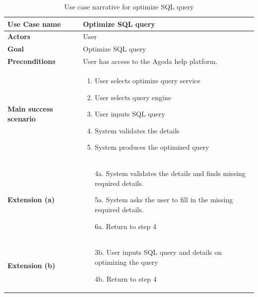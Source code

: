     \begin{table}[H]
        \centering
        \caption{Use case narrative for optimize SQL query}
        \label{tbl:use-case-optimize-sql}
        \begin{tabular}{|p{4cm}|p{10cm}|}
        \hline
        \textbf{Use Case name} & Optimize SQL query \\ \hline
        \textbf{Actors} & User \\ \hline
        \textbf{Goal} & Optimize SQL query \\ \hline
        \textbf{Preconditions} & User has access to the Agoda help platform. \\ \hline
        \textbf{Main success scenario} &
        \begin{enumerate}
            \item User selects optimize query service
            \item User selects query engine
            \item User inputs SQL query
            \item System validates the details
            \item System produces the optimized query
        \end{enumerate}
        \\ \hline
        \textbf{Extension (a)} &
        \begin{enumerate}
            \item[4a.] System validates the details and finds missing required details.
            \item[5a.] System asks the user to fill in the missing required details.
            \item[6a.] Return to step 4
        \end{enumerate}
        \\ \hline
        \textbf{Extension (b)} &
        \begin{enumerate}
            \item[3b.] User inputs SQL query and details on optimizing the query
            \item[4b.] Return to step 4
        \end{enumerate}
        \\ \hline
        \end{tabular}
    \end{table}
